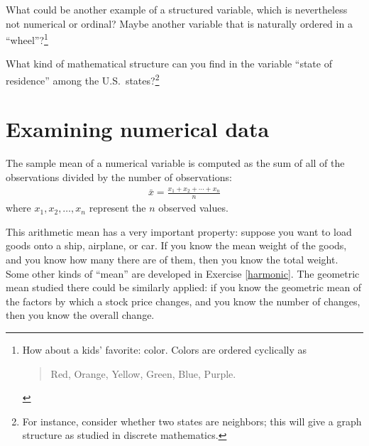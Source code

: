 \begin{exercise} %
What could be another example of a structured variable, which is nevertheless not numerical or ordinal?
Maybe another variable that is naturally ordered in a ``wheel''?\footnote{How about a kids' favorite: color. Colors are ordered cyclically as
 \begin{quote}
	 Red,
	 Orange,
	 Yellow,
	 Green,
	 Blue,
	 Purple.
 \end{quote}
}
\end{exercise}

\begin{exercise}%
	What kind of mathematical structure can you find in the variable ``state of residence'' among the U.S.~states?\footnote{For instance, consider whether two states are neighbors; this will give a graph structure as studied in discrete mathematics.}
\end{exercise}

\section[Examining numerical data]{Examining numerical data}
\label{numericalData}

\begin{termBox}{%
The sample mean of a numerical variable is computed as the sum of all of the observations divided by the number of observations:
\begin{eqnarray}
\bar{x} = \frac{x_1+x_2+\cdots+x_n}{n}
\label{meanEquation}
\end{eqnarray}
where $x_1, x_2, \dots, x_n$ represent the $n$ observed values.}
\end{termBox}\vspace{-2mm}


This arithmetic mean has a very important property: suppose you want to load goods onto a ship, airplane, or car. If you know the mean weight of the goods, and you know how many there are of them, then you know the total weight. Some other kinds of ``mean'' are developed in Exercise \ref{harmonic}. The geometric mean studied there could be similarly applied: if you know the geometric mean of the factors by which a stock price changes, and you know the number of changes, then you know the overall change.


